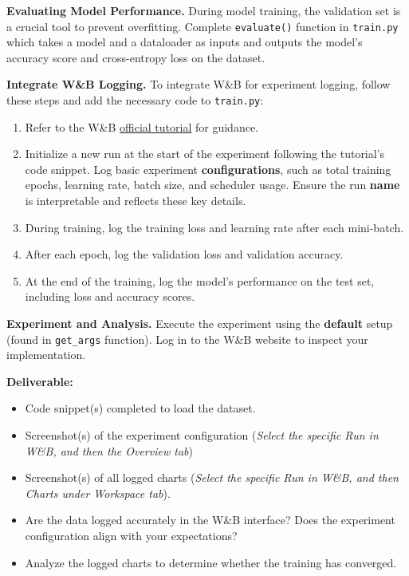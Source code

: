 \documentclass[11pt, oneside]{article}   	%
\begin{document}
\noindent \textbf{Evaluating Model Performance.}
During model training, the validation set is a crucial tool to prevent overfitting. Complete \texttt{evaluate()} function in \texttt{train.py} which takes a model and a dataloader as inputs and outputs the model's accuracy score and cross-entropy loss on the dataset. 

\noindent \textbf{Integrate W\&B Logging.}
To integrate W\&B for experiment logging, follow these steps and add the necessary code to \texttt{train.py}:
\begin{enumerate}
    \item Refer to the W\&B \href{https://docs.wandb.ai/tutorials/experiments}{official tutorial} for guidance.
    \item Initialize a new run at the start of the experiment following the tutorial's code snippet. Log basic experiment \textbf{configurations}, such as total training epochs, learning rate, batch size, and scheduler usage. Ensure the run \textbf{name} is interpretable and reflects these key details.
    \item During training, log the training loss and learning rate after each mini-batch.
    \item After each epoch, log the validation loss and validation accuracy.
    \item At the end of the training, log the model's performance on the test set, including loss and accuracy scores.
\end{enumerate}

\noindent \textbf{Experiment and Analysis. }
Execute the experiment using the \textbf{default} setup (found in \texttt{get\_args} function). Log in to the W\&B website to inspect your implementation.

\noindent\textbf{Deliverable:}
\begin{itemize}
    \item Code snippet(s) completed to load the dataset.
    \item Screenshot(s) of the experiment configuration (\textit{Select the specific Run in W\&B, and then the Overview tab})
    \item Screenshot(s) of all logged charts (\textit{Select the specific Run in W\&B, and then Charts under Workspace tab}).
    \item Are the data logged accurately in the W\&B interface? Does the experiment configuration align with your expectations?
    \item Analyze the logged charts to determine whether the training has converged. 
\end{itemize}
\end{document}
